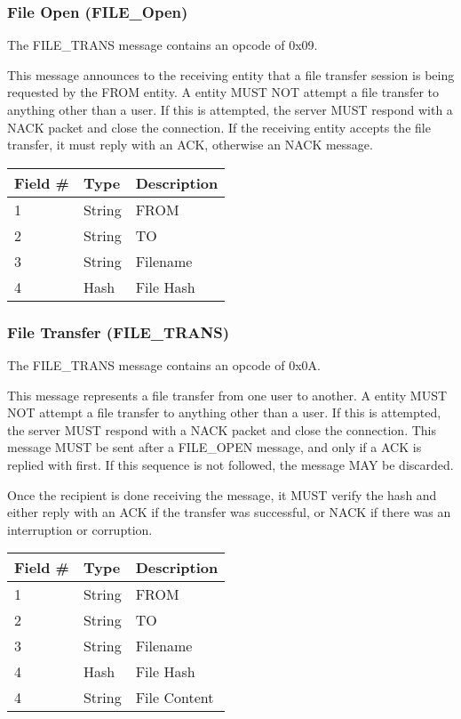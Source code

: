 \documentclass[12pt]{article}
\begin{document}
\subsubsection{File Open (FILE\_Open)}
The FILE\_TRANS message contains an opcode of 0x09.

This message announces to the receiving entity that a file transfer session is
being requested by the FROM entity. A entity MUST
NOT attempt a file transfer to anything other than a user. If this is attempted,
the server MUST respond with a NACK packet and close the connection. If the
receiving entity accepts the file transfer, it must reply with an ACK, otherwise
an NACK message.

\begin{table}[ht]
\begin{tabular} {|l|l|l|}
    \hline 
    Field \# & Type & Description \\
    \hline
    1 & String & FROM \\
    2 & String & TO \\
    3 & String & Filename \\
    4 & Hash & File Hash \\
    \hline
\end{tabular}
\end{table}

\subsubsection{File Transfer (FILE\_TRANS)}
The FILE\_TRANS message contains an opcode of 0x0A.

This message represents a file transfer from one user to another. A entity MUST
NOT attempt a file transfer to anything other than a user. If this is attempted,
the server MUST respond with a NACK packet and close the connection. This
message MUST be sent after a FILE\_OPEN message, and only if a ACK is
replied with first. If this sequence is not followed, the message MAY be discarded.

Once the recipient is done receiving the message, it MUST verify the hash and
either reply with an ACK if the transfer was successful, or NACK if there was an
interruption or corruption.

\begin{table}[ht]
\begin{tabular} {|l|l|l|}
    \hline 
    Field \# & Type & Description \\
    \hline
    1 & String & FROM \\
    2 & String & TO \\
    3 & String & Filename \\
    4 & Hash & File Hash \\
    4 & String & File Content \\
    \hline
\end{tabular}
\end{table}
\end{document}
